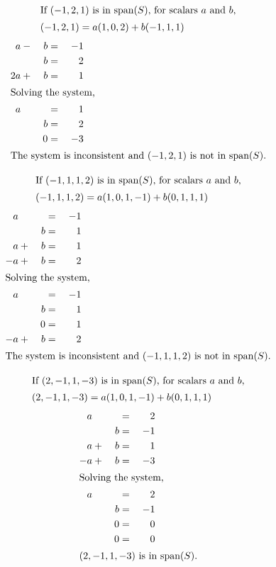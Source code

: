\documentclass[12pt]{article}
\newenvironment{problem}[2][Problem]{\begin{trivlist}
\item[\hskip \labelsep {\bfseries #1}\hskip \labelsep {\bfseries #2.}]}{\end{trivlist}}
\begin{document}
\begin{problem}{5.b}
\end{problem}
\begin{align*}
\intertext{If $(-1,2,1)$ is in span($S$), for scalars $a$ and $b$,}
(-1,2,1) &= a(1,0,2) + b(-1,1,1) 
\end{align*}
\begin{alignat*}{3}
 a&{}-{}&b&{}={}& -1\\
  &     &b&{}={}& 2\\
2a&{}+{}&b&{}={}& 1\\
\shortintertext{Solving the system,}
 a&     & &{}={}& 1\\
  &     &b&{}={}& 2\\
  &     &0&{}={}& -3\\
\intertext{The system is inconsistent and $(-1,2,1)$ is not in span($S$).}
\end{alignat*}
\filbreak

\begin{problem}{5.c}
\end{problem}
\begin{align*}
\intertext{If $(-1,1,1,2)$ is in span($S$), for scalars $a$ and $b$,}
(-1,1,1,2) &= a(1,0,1,-1) + b(0,1,1,1) 
\end{align*}
\begin{alignat*}{3}
 a&{}   & &{}={}& -1\\
  &     &b&{}={}& 1\\
 a&{}+{}&b&{}={}& 1\\
-a&{}+{}&b&{}={}& 2\\
\shortintertext{Solving the system,}
 a&{}   & &{}={}& -1\\
  &     &b&{}={}& 1\\
  &     &0&{}={}& 1\\
-a&{}+{}&b&{}={}& 2\\
\intertext{The system is inconsistent and $(-1,1,1,2)$ is not in span($S$).}
\end{alignat*}
\filbreak

\begin{problem}{5.d}
\end{problem}
\begin{align*}
\intertext{If $(2,-1,1,-3)$ is in span($S$), for scalars $a$ and $b$,}
(2,-1,1,-3) &= a(1,0,1,-1) + b(0,1,1,1) 
\end{align*}
\begin{alignat*}{3}
 a&     & &{}={}& 2\\
  &     &b&{}={}& -1\\
 a&{}+{}&b&{}={}& 1\\
-a&{}+{}&b&{}={}& -3\\
\shortintertext{Solving the system,}
 a&     & &{}={}& 2\\
  &     &b&{}={}& -1\\
  &     &0&{}={}& 0\\
  &     &0&{}={}& 0\\
\intertext{$(2,-1,1,-3)$ is in span($S$).}
\end{alignat*}
\filbreak
\end{document}
